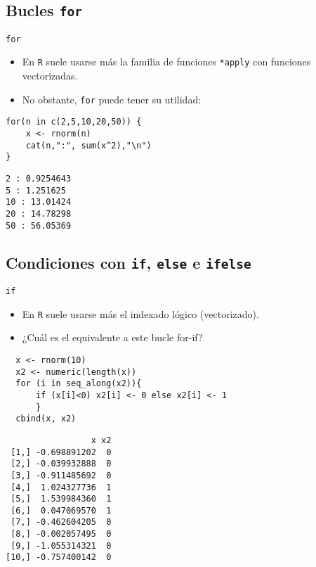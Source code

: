 \documentclass[xcolor={usenames,svgnames,dvipsnames}]{beamer}
\begin{document}
\subsection{Bucles \texttt{for}}
\label{sec:org6d671ab}
\begin{frame}[fragile,label={sec:org4ba4319}]{\texttt{for}}
 \begin{itemize}
\item En \texttt{R} suele usarse más la familia de funciones \texttt{*apply} con funciones vectorizadas.
\item No obstante, \texttt{for} puede tener su utilidad:
\end{itemize}
\lstset{language=r,label= ,caption= ,captionpos=b,numbers=none}
\begin{lstlisting}
for(n in c(2,5,10,20,50)) {
    x <- rnorm(n)
    cat(n,":", sum(x^2),"\n")
}
\end{lstlisting}

\begin{verbatim}
2 : 0.9254643 
5 : 1.251625 
10 : 13.01424 
20 : 14.78298 
50 : 56.05369
\end{verbatim}
\end{frame}

\subsection{Condiciones con \texttt{if}, \texttt{else} e \texttt{ifelse}}
\label{sec:org32f5933}
\begin{frame}[fragile,label={sec:org243e2e5}]{\texttt{if}}
 \begin{itemize}
\item En \texttt{R} suele usarse más el indexado lógico (vectorizado).
\item ¿Cuál es el equivalente a este bucle for-if?
\end{itemize}
\lstset{language=r,label= ,caption= ,captionpos=b,numbers=none}
\begin{lstlisting}
  x <- rnorm(10)
  x2 <- numeric(length(x))
  for (i in seq_along(x2)){
      if (x[i]<0) x2[i] <- 0 else x2[i] <- 1
      }
  cbind(x, x2)
\end{lstlisting}

\begin{verbatim}
                 x x2
 [1,] -0.698891202  0
 [2,] -0.039932888  0
 [3,] -0.911485692  0
 [4,]  1.024327736  1
 [5,]  1.539984360  1
 [6,]  0.047069570  1
 [7,] -0.462604205  0
 [8,] -0.002057495  0
 [9,] -1.055314321  0
[10,] -0.757400142  0
\end{verbatim}
\end{frame}
\end{document}
